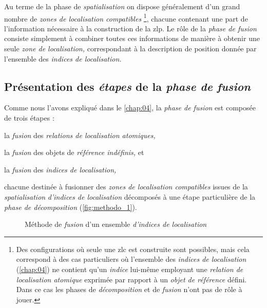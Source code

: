 Au terme de la phase de \emph{spatialisation} on dispose généralement
d'un grand nombre de \emph{zones de localisation compatibles}
\footnote{Des configurations où seule une \ac{zlc} est construite sont
  possibles, mais cela correspond à des cas particuliers où l'ensemble
  des \emph{indices de localisation} (\autoref{chap:04}) ne contient
  qu'un \emph{indice} lui-même employant une \emph{relation de
    localisation atomique} exprimée par rapport à un \emph{objet de
    référence} défini. Dans ce cas les phases de \emph{décomposition}
  et de \emph{fusion} n'ont pas de rôle à jouer.}, chacune contenant
une part de l'information nécessaire à la construction de la
\ac{zlp}. Le rôle de la \emph{phase de fusion} consiste simplement à
combiner toutes ces informations de manière à obtenir une seule
\emph{zone de localisation,} correspondant à la description de
position donnée par l'ensemble des \emph{indices de localisation.}






\subsection{Présentation des \emph{étapes} de la \emph{phase de
    fusion}}

Comme nous l'avons expliqué dans le \autoref{chap:04}, la \emph{phase
  de fusion} est composée de trois étapes :
%
\begin{enumerate*}[label=(\arabic*)]
\item la \emph{fusion} des \emph{relations de localisation atomiques,}
\item la \emph{fusion} des objets de \emph{référence indéfinis,} et
\item la \emph{fusion} des \emph{indices de localisation,}
\end{enumerate*}
%
chacune destinée à fusionner des \emph{zones de localisation
  compatibles} issues de la \emph{spatialisation} \emph{d'indices de
  localisation} décomposés à une étape particulière de la \emph{phase
  de décomposition} (\autoref{fig:methodo_1}).

\begin{figure}
  \centering
  
  \caption{Méthode de \emph{fusion} d'un ensemble \emph{d'indices de localisation}}
  \label{fig:methodo_fusion}
\end{figure}

